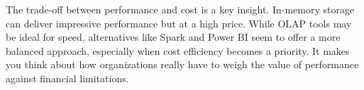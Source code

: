 The trade-off between performance and cost is a key insight. In-memory storage can deliver impressive performance but at a high price. 
While OLAP tools may be ideal for speed, alternatives like Spark and Power BI seem to offer a more balanced approach, 
especially when cost efficiency becomes a priority. 
It makes you think about how organizations really have to weigh the value of performance against financial limitations.





